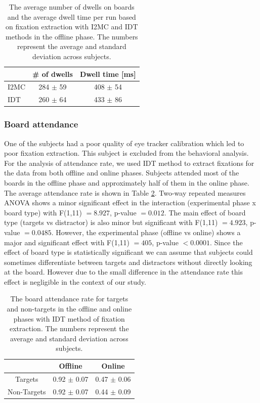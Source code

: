 \documentclass[12pt]{iopart}
\begin{document}
\begin{table}
    \centering
    \caption{The average number of dwells on boards and the average 
        dwell time per run
    based on fixation extraction with I2MC and IDT methods in the
    offline phase.
    The numbers represent the average and standard deviation across subjects.
}
    \begin{tabular}{l | c |c}
        \hline 
        & \# of dwells & Dwell time [ms] \\
        \hline 
        I2MC & 284 $\pm$ 59  & 408 $\pm$ 54 \\
        IDT & 260 $\pm$ 64  & 433 $\pm$ 86 \\
        \hline 
    \end{tabular}
    \label{tab:EyeMethods}
\end{table}
\subsubsection*{Board attendance}
One of the subjects
had a poor quality of eye tracker calibration which led
to poor fixation extraction.
This subject is excluded from the behavioral analysis.
For the analysis of attendance rate, we used IDT method to extract fixations 
for the data from both offline and online phases.
Subjects attended most of the boards in the offline phase and approximately
half of them in the online phase. 
The average attendance rate
is shown in Table \ref{tab:boardAtt}. 
Two-way repeated measures ANOVA shows a minor significant effect 
in the interaction (experimental phase x board type) with F(1,11) $= 8.927$, p-value $= 0.012$. 
The main effect of board type (targets vs distractor) is also minor but significant with F(1,11) $= 4.923$, p-value $=0.0485$. 
However, the experimental phase (offline vs online)
shows a major and significant effect with F(1,11) $= 405$, p-value $< 0.0001$.
Since the effect of board type is statistically significant
we can assume that subjects could sometimes differentiate between targets
and distractors without directly looking at the board.
However due to the small difference in the attendance rate
this effect is negligible in the context of our study.


\begin{table}
    \centering
    \caption{The board attendance rate for targets and non-targets in the offline and online phases with IDT method of fixation
        extraction.
    The numbers represent the average and standard deviation across subjects.}
    \begin{tabular}{c | c | c}
        \hline 
        & Offline & Online \\
        \hline 
        Targets & 0.92 $\pm$ 0.07 & 0.47 $\pm$ 0.06 \\
        Non-Targets & 0.92 $\pm$ 0.07 & 0.44 $\pm$ 0.09 \\
        \hline 
    \end{tabular}
    \label{tab:boardAtt}
\end{table}
\end{document}
